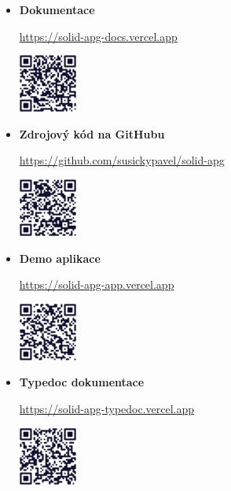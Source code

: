 \begin{itemize}
      \item \textbf{Dokumentace}

            \url{https://solid-apg-docs.vercel.app}

            \includegraphics[width=0.15\textwidth]{assets/figures/qr/docs.png}
      \item \textbf{Zdrojový kód na GitHubu}

            \url{https://github.com/susickypavel/solid-apg}

            \includegraphics[width=0.15\textwidth]{assets/figures/qr/github.png}
      \item \textbf{Demo aplikace}

            \url{https://solid-apg-app.vercel.app}

            \includegraphics[width=0.15\textwidth]{assets/figures/qr/demo.png}
      \item \textbf{Typedoc dokumentace}

            \url{https://solid-apg-typedoc.vercel.app}

            \includegraphics[width=0.15\textwidth]{assets/figures/qr/typedoc.png}
\end{itemize}
